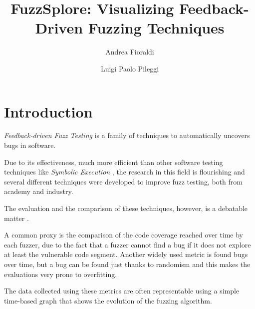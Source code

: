 \documentclass[conference,compsoc]{IEEEtran}
\begin{document}
\title{FuzzSplore: Visualizing Feedback-Driven Fuzzing Techniques}

\author[1,2]{Andrea Fioraldi}
\author[1]{Luigi Paolo Pileggi}

\maketitle

\section{Introduction}

{\it Feedback-driven Fuzz Testing} is a family of techniques to automatically uncovers bugs in software.

Due to its effectiveness, much more efficient than other software testing techniques like {\it Symbolic Execution} \cite{redqueen} \cite{sebastian}, the research in this field is flourishing and several different techniques were developed to improve fuzz testing, both from academy and industry.

The evaluation and the comparison of these techniques, however, is a debatable matter \cite{fuzzeval}.

A common proxy is the comparison of the code coverage reached over time by each fuzzer, due to the fact that a fuzzer cannot find a bug if it does not explore at least the vulnerable code segment.
Another widely used metric is found bugs over time, but a bug can be found just thanks to randomism and this makes the evaluations very prone to overfitting.

The data collected using these metrics are often representable using a simple time-based graph that shows the evolution of the fuzzing algorithm.
\end{document}
